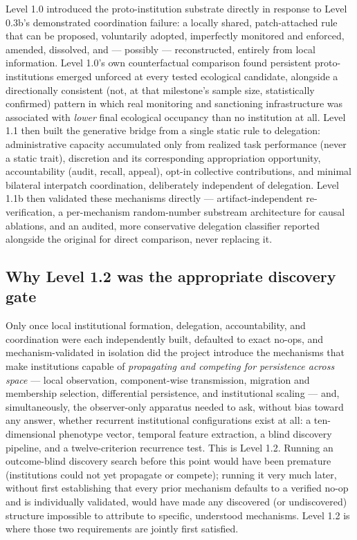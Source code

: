 Level 1.0 introduced the proto-institution substrate directly in response
to Level 0.3b's demonstrated coordination failure: a locally shared,
patch-attached rule that can be proposed, voluntarily adopted, imperfectly
monitored and enforced, amended, dissolved, and --- possibly ---
reconstructed, entirely from local information. Level 1.0's own
counterfactual comparison found persistent proto-institutions emerged
unforced at every tested ecological candidate, alongside a
directionally consistent (not, at that milestone's sample size,
statistically confirmed) pattern in which real monitoring and
sanctioning infrastructure was associated with \textit{lower} final
ecological occupancy than no institution at all. Level 1.1 then built the
generative bridge from a single static rule to delegation: administrative
capacity accumulated only from realized task performance (never a static
trait), discretion and its corresponding appropriation opportunity,
accountability (audit, recall, appeal), opt-in collective contributions,
and minimal bilateral interpatch coordination, deliberately independent of
delegation. Level 1.1b then validated these mechanisms directly ---
artifact-independent re-verification, a per-mechanism random-number
substream architecture for causal ablations, and an audited, more
conservative delegation classifier reported alongside the original for
direct comparison, never replacing it.

\subsection{Why Level 1.2 was the appropriate discovery gate}
\label{sec:why-level12}

Only once local institutional formation, delegation, accountability, and
coordination were each independently built, defaulted to exact no-ops, and
mechanism-validated in isolation did the project introduce the mechanisms
that make institutions capable of \textit{propagating and competing for
persistence across space} --- local observation, component-wise
transmission, migration and membership selection, differential
persistence, and institutional scaling --- and, simultaneously, the
observer-only apparatus needed to ask, without bias toward any answer,
whether recurrent institutional configurations exist at all: a
ten-dimensional phenotype vector, temporal feature extraction, a blind
discovery pipeline, and a twelve-criterion recurrence test. This is Level
1.2. Running an outcome-blind discovery search before this point would have
been premature (institutions could not yet propagate or compete); running
it very much later, without first establishing that every prior mechanism
defaults to a verified no-op and is individually validated, would have
made any discovered (or undiscovered) structure impossible to attribute to
specific, understood mechanisms. Level 1.2 is where those two
requirements are jointly first satisfied.

